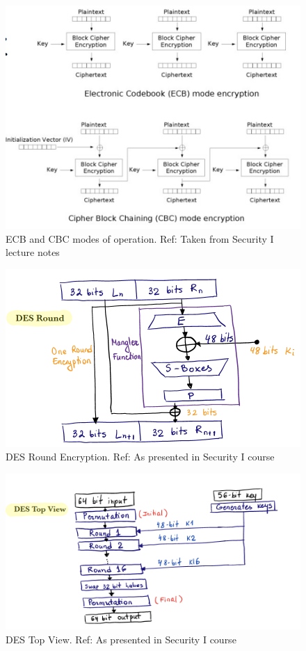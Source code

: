 \begin{figure}[h!]
  \includegraphics[width=\linewidth]{modes.jpg}
  \caption{ECB and CBC modes of operation. Ref: Taken from Security I lecture notes}
  \label{fig:modes}
\end{figure}

\begin{figure}[h!]
  \includegraphics[width=\linewidth]{desround.jpg}
  \caption{DES Round Encryption. Ref: As presented in Security I course}
  \label{fig:desround}
\end{figure}

\begin{figure}[h!]
  \includegraphics[width=\linewidth]{destopview.jpg}
  \caption{DES Top View. Ref: As presented in Security I course}
  \label{fig:destopview}
\end{figure}

